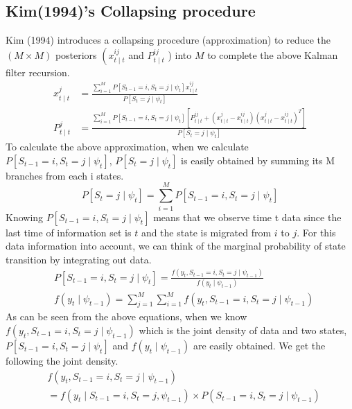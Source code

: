\documentclass[UTF8,12pt]{ctexart}
\numberwithin{equation}{section}%
\begin{document}
	\subsection{Kim(1994)’s Collapsing procedure}
	Kim (1994) introduces a collapsing procedure (approximation) to reduce the $(M \times M)$ posteriors $\left(x_{t \mid t}^{i j}\right.$ and $P_{t \mid t}^{i j}$ ) into $M$ to complete the above Kalman filter recursion.
	$$
	\begin{aligned}
		x_{t \mid t}^j & =\frac{\sum_{i=1}^M P\left[S_{t-1}=i, S_t=j \mid \psi_t\right] x_{t \mid t}^{i j}}{P\left[S_t=j \mid \psi_t\right]} \\
		P_{t \mid t}^j & =\frac{\sum_{i=1}^M P\left[S_{t-1}=i, S_t=j \mid \psi_t\right]\left[P_{t \mid t}^{i j}+\left(x_{t \mid t}^j-x_{t \mid t}^{i j}\right)\left(x_{t \mid t}^j-x_{t \mid t}^{i j}\right)^T\right]}{P\left[S_t=j \mid \psi_t\right]}
	\end{aligned}
	$$
	To calculate the above approximation, when we calculate $P\left[S_{t-1}=i, S_t=j \mid \psi_t\right]$, $P\left[S_t=j \mid \psi_t\right]$ is easily obtained by summing its $\mathrm{M}$ branches from each i states.
	$$
	P\left[S_t=j \mid \psi_t\right]=\sum_{i=1}^M P\left[S_{t-1}=i, S_t=j \mid \psi_t\right]
	$$
	Knowing $P\left[S_{t-1}=i, S_t=j \mid \psi_t\right]$ means that we observe time t data since the last time of information set is $t$ and the state is migrated from $i$ to $j$. For this data information into account, we can think of the marginal probability of state transition by integrating out data.
	$$
	\begin{aligned}
		& P\left[S_{t-1}=i, S_t=j \mid \psi_t\right]=\frac{f\left(y_t, S_{t-1}=i, S_t=j \mid \psi_{t-1}\right)}{f\left(y_t \mid \psi_{t-1}\right)} \\
		& f\left(y_t \mid \psi_{t-1}\right)=\sum_{j=1}^M \sum_{i=1}^M f\left(y_t, S_{t-1}=i, S_t=j \mid \psi_{t-1}\right)
	\end{aligned}
	$$
	As can be seen from the above equations, when we know $f\left(y_t, S_{t-1}=i, S_t=j \mid \psi_{t-1}\right)$ which is the joint density of data and two states, $P\left[S_{t-1}=i, S_t=j \mid \psi_t\right]$ and $f\left(y_t \mid \psi_{t-1}\right)$ are easily obtained. We get the following the joint density.
	$$
	\begin{aligned}
		& f\left(y_t, S_{t-1}=i, S_t=j \mid \psi_{t-1}\right) \\
		& =f\left(y_t \mid S_{t-1}=i, S_t=j, \psi_{t-1}\right) \times P\left(S_{t-1}=i, S_t=j \mid \psi_{t-1}\right)
	\end{aligned}
	$$
\end{document}
